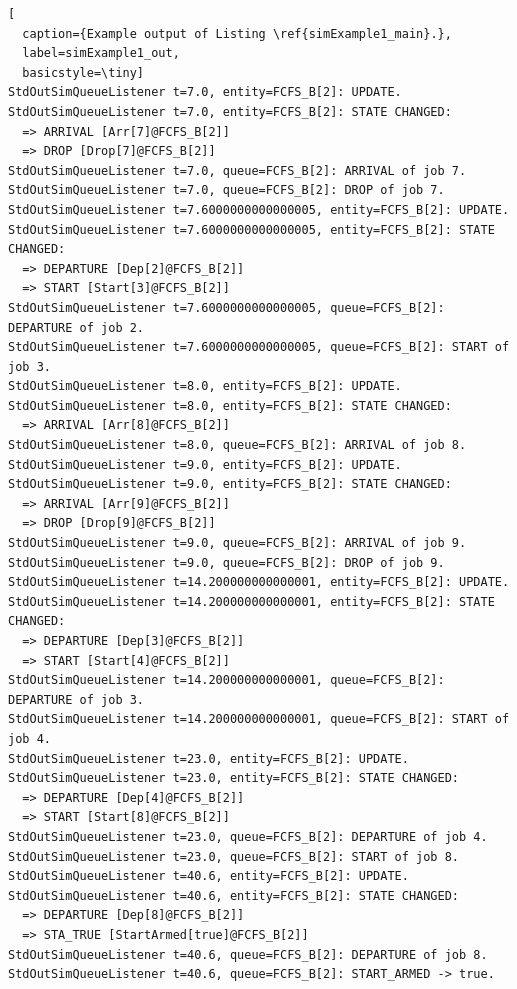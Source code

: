 \documentclass[12pt]{book}
\begin{document}
\begin{lstlisting}[
  caption={Example output of Listing \ref{simExample1_main}.},
  label=simExample1_out,
  basicstyle=\tiny]
StdOutSimQueueListener t=7.0, entity=FCFS_B[2]: UPDATE.
StdOutSimQueueListener t=7.0, entity=FCFS_B[2]: STATE CHANGED:
  => ARRIVAL [Arr[7]@FCFS_B[2]]
  => DROP [Drop[7]@FCFS_B[2]]
StdOutSimQueueListener t=7.0, queue=FCFS_B[2]: ARRIVAL of job 7.
StdOutSimQueueListener t=7.0, queue=FCFS_B[2]: DROP of job 7.
StdOutSimQueueListener t=7.6000000000000005, entity=FCFS_B[2]: UPDATE.
StdOutSimQueueListener t=7.6000000000000005, entity=FCFS_B[2]: STATE CHANGED:
  => DEPARTURE [Dep[2]@FCFS_B[2]]
  => START [Start[3]@FCFS_B[2]]
StdOutSimQueueListener t=7.6000000000000005, queue=FCFS_B[2]: DEPARTURE of job 2.
StdOutSimQueueListener t=7.6000000000000005, queue=FCFS_B[2]: START of job 3.
StdOutSimQueueListener t=8.0, entity=FCFS_B[2]: UPDATE.
StdOutSimQueueListener t=8.0, entity=FCFS_B[2]: STATE CHANGED:
  => ARRIVAL [Arr[8]@FCFS_B[2]]
StdOutSimQueueListener t=8.0, queue=FCFS_B[2]: ARRIVAL of job 8.
StdOutSimQueueListener t=9.0, entity=FCFS_B[2]: UPDATE.
StdOutSimQueueListener t=9.0, entity=FCFS_B[2]: STATE CHANGED:
  => ARRIVAL [Arr[9]@FCFS_B[2]]
  => DROP [Drop[9]@FCFS_B[2]]
StdOutSimQueueListener t=9.0, queue=FCFS_B[2]: ARRIVAL of job 9.
StdOutSimQueueListener t=9.0, queue=FCFS_B[2]: DROP of job 9.
StdOutSimQueueListener t=14.200000000000001, entity=FCFS_B[2]: UPDATE.
StdOutSimQueueListener t=14.200000000000001, entity=FCFS_B[2]: STATE CHANGED:
  => DEPARTURE [Dep[3]@FCFS_B[2]]
  => START [Start[4]@FCFS_B[2]]
StdOutSimQueueListener t=14.200000000000001, queue=FCFS_B[2]: DEPARTURE of job 3.
StdOutSimQueueListener t=14.200000000000001, queue=FCFS_B[2]: START of job 4.
StdOutSimQueueListener t=23.0, entity=FCFS_B[2]: UPDATE.
StdOutSimQueueListener t=23.0, entity=FCFS_B[2]: STATE CHANGED:
  => DEPARTURE [Dep[4]@FCFS_B[2]]
  => START [Start[8]@FCFS_B[2]]
StdOutSimQueueListener t=23.0, queue=FCFS_B[2]: DEPARTURE of job 4.
StdOutSimQueueListener t=23.0, queue=FCFS_B[2]: START of job 8.
StdOutSimQueueListener t=40.6, entity=FCFS_B[2]: UPDATE.
StdOutSimQueueListener t=40.6, entity=FCFS_B[2]: STATE CHANGED:
  => DEPARTURE [Dep[8]@FCFS_B[2]]
  => STA_TRUE [StartArmed[true]@FCFS_B[2]]
StdOutSimQueueListener t=40.6, queue=FCFS_B[2]: DEPARTURE of job 8.
StdOutSimQueueListener t=40.6, queue=FCFS_B[2]: START_ARMED -> true.

\end{lstlisting}
\end{document}
